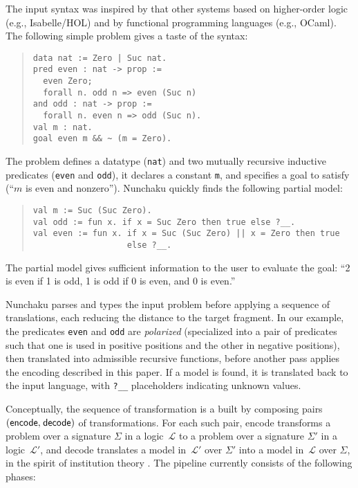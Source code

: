 The input syntax was inspired by that other systems based on higher-order
logic (e.g., Isabelle/HOL) and by functional programming languages (e.g.,
OCaml). The following simple problem gives a taste of the syntax:
%
\begin{quote}
\verb$data nat := Zero | Suc nat.$ \\[2\jot]
\verb$pred even : nat -> prop :=$ \\
\verb$  even Zero;$ \\
\verb$  forall n. odd n => even (Suc n)$ \\
\verb$and odd : nat -> prop :=$ \\
\verb$  forall n. even n => odd (Suc n).$ \\[2\jot]
\verb$val m : nat.$ \\
\verb$goal even m && ~ (m = Zero).$
\end{quote}
%
The problem defines a datatype (\texttt{nat}) and two mutually recursive
inductive predicates (\texttt{even} and \texttt{odd}), it declares a constant
\texttt{m}, and specifies a goal to satisfy (``$m$ is even and nonzero'').
Nunchaku quickly finds the following partial model:
%
\begin{quote}
\verb$val m := Suc (Suc Zero).$ \\
\verb$val odd := fun x. if x = Suc Zero then true else ?__.$ \\
\verb$val even := fun x. if x = Suc (Suc Zero) || x = Zero then true$ \\
\verb$                   else ?__.$
\end{quote}
%
The partial model gives sufficient information to the user to evaluate the
goal: ``2 is even if 1 is odd, 1 is odd if 0 is even, and 0 is even.''

Nunchaku parses and types the input problem before applying a sequence
of translations, each reducing the distance to the target fragment.
In our example, the predicates
\verb!even! and \verb!odd! are \emph{polarized} (specialized into a pair of
predicates such that one is used in positive positions and the other in
negative positions),
then translated into admissible recursive functions,
before another pass applies the encoding described in this paper.
If a model is found, it is translated back to the input language,
with \verb$?__$ placeholders indicating unknown values.

Conceptually, the sequence of transformation is a 
built by composing pairs $(\textsf{encode},\vthinspace \textsf{decode})$ of
transformations. For each such pair, \textsf{encode} transforms a problem over
a signature $\Sigma$ in a logic~$\mathcal{L}$ to a problem over a signature
$\Sigma'$ in a logic~$\mathcal{L}'$, and \textsf{decode} translates a model
in~$\mathcal{L}'$ over $\Sigma'$ into a model in~$\mathcal{L}$ over $\Sigma$,
in the spirit of institution theory \cite{goguen-burstall-1992}. The
pipeline currently consists of the following phases:

